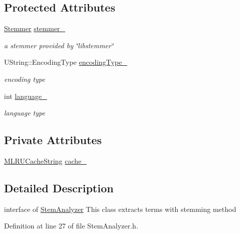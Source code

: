 \subsection*{Protected Attributes}
\begin{CompactItemize}
\item 
\hyperlink{classla__manager_1_1stem_1_1Stemmer}{Stemmer} \hyperlink{classla__manager_1_1StemAnalyzer_9b62790b49a8b011722029948483099a}{stemmer\_\-}
\begin{CompactList}\small\item\em a stemmer provided by \char`\"{}libstemmer\char`\"{} \item\end{CompactList}\item 
UString::EncodingType \hyperlink{classla__manager_1_1StemAnalyzer_f9c9b55d970a5fac76d890c59ee909fb}{encodingType\_\-}
\begin{CompactList}\small\item\em encoding type \item\end{CompactList}\item 
int \hyperlink{classla__manager_1_1StemAnalyzer_b83df9d67ea2e32b8f7c92ee1c9d8292}{language\_\-}
\begin{CompactList}\small\item\em language type \item\end{CompactList}\end{CompactItemize}
\subsection*{Private Attributes}
\begin{CompactItemize}
\item 
\hyperlink{namespacela__manager_8a93c4bd160d94957812fb620225a17e}{MLRUCacheString} \hyperlink{classla__manager_1_1StemAnalyzer_f874202062430a5bce7b8ca72ee632ea}{cache\_\-}
\end{CompactItemize}


\subsection{Detailed Description}
interface of \hyperlink{classla__manager_1_1StemAnalyzer}{StemAnalyzer} This class extracts terms with stemming method 

Definition at line 27 of file StemAnalyzer.h.

